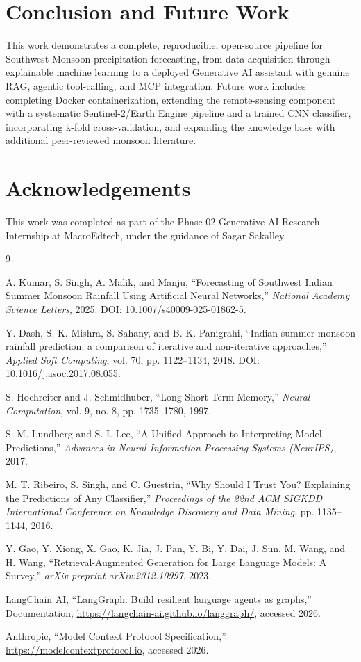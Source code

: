 \documentclass[11pt]{article}
\begin{document}
\section{Conclusion and Future Work}
This work demonstrates a complete, reproducible, open-source pipeline for Southwest Monsoon precipitation forecasting, from data acquisition through explainable machine learning to a deployed Generative AI assistant with genuine RAG, agentic tool-calling, and MCP integration. Future work includes completing Docker containerization, extending the remote-sensing component with a systematic Sentinel-2/Earth Engine pipeline and a trained CNN classifier, incorporating k-fold cross-validation, and expanding the knowledge base with additional peer-reviewed monsoon literature.

\section*{Acknowledgements}
This work was completed as part of the Phase 02 Generative AI Research Internship at MacroEdtech, under the guidance of Sagar Sakalley.

\begin{thebibliography}{9}

A. Kumar, S. Singh, A. Malik, and Manju, ``Forecasting of Southwest Indian Summer Monsoon Rainfall Using Artificial Neural Networks,'' \textit{National Academy Science Letters}, 2025. DOI: \url{10.1007/s40009-025-01862-5}.

Y. Dash, S. K. Mishra, S. Sahany, and B. K. Panigrahi, ``Indian summer monsoon rainfall prediction: a comparison of iterative and non-iterative approaches,'' \textit{Applied Soft Computing}, vol. 70, pp. 1122--1134, 2018. DOI: \url{10.1016/j.asoc.2017.08.055}.

S. Hochreiter and J. Schmidhuber, ``Long Short-Term Memory,'' \textit{Neural Computation}, vol. 9, no. 8, pp. 1735--1780, 1997.

S. M. Lundberg and S.-I. Lee, ``A Unified Approach to Interpreting Model Predictions,'' \textit{Advances in Neural Information Processing Systems (NeurIPS)}, 2017.

M. T. Ribeiro, S. Singh, and C. Guestrin, ``Why Should I Trust You? Explaining the Predictions of Any Classifier,'' \textit{Proceedings of the 22nd ACM SIGKDD International Conference on Knowledge Discovery and Data Mining}, pp. 1135--1144, 2016.

Y. Gao, Y. Xiong, X. Gao, K. Jia, J. Pan, Y. Bi, Y. Dai, J. Sun, M. Wang, and H. Wang, ``Retrieval-Augmented Generation for Large Language Models: A Survey,'' \textit{arXiv preprint arXiv:2312.10997}, 2023.

LangChain AI, ``LangGraph: Build resilient language agents as graphs,'' Documentation, \url{https://langchain-ai.github.io/langgraph/}, accessed 2026.

Anthropic, ``Model Context Protocol Specification,'' \url{https://modelcontextprotocol.io}, accessed 2026.

\end{thebibliography}
\end{document}
